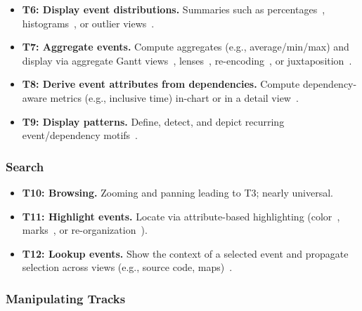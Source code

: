 \begin{refsection}
\begin{itemize}\itemsep0.25ex
\item \textbf{T6: Display event distributions.} Summaries such as percentages~\cite{adhianto2010hpctoolkit}, histograms~\cite{sakin2022traveler}, or outlier views~\cite{jo2014livegantt, schaubschlaeger2003event}. 

\item \textbf{T7: Aggregate events.} Compute aggregates (e.g., average/min/max) and display via aggregate Gantt views~\cite{sakin2022traveler, nesi2023summarizing, kaldor2017canopy}, lenses~\cite{jo2014livegantt}, re-encoding~\cite{topol1998pvanim}, or juxtaposition~\cite{gupta2016movementslicer}.

\item \textbf{T8: Derive event attributes from dependencies.} Compute dependency-aware metrics (e.g., inclusive time) in-chart or in a detail view~\cite{adhianto2010hpctoolkit, sakin2022traveler}.

\item \textbf{T9: Display patterns.} Define, detect, and depict recurring event/dependency motifs~\cite{de2010zinsight, isaacs2014combing}.
\end{itemize}

\subsubsection{Search}

\begin{itemize}\itemsep0.25ex
\item \textbf{T10: Browsing.} Zooming and panning leading to T3; nearly universal.

\item \textbf{T11: Highlight events.} Locate via attribute-based highlighting (color~\cite{adhianto2010hpctoolkit, isaacs2014combing, zaki1999toward, sakin2022traveler, nesi2023summarizing, kaldor2017canopy, dkabrowski2024manufacturing}, marks~\cite{sun2021daisen}, or re-organization~\cite{jo2014livegantt,luz2010improving}).

\item \textbf{T12: Lookup events.} Show the context of a selected event and propagate selection across views (e.g., source code, maps)~\cite{yan1995performance, adhianto2010hpctoolkit, zaki1999toward, gupta2016movementslicer}.
\end{itemize}

\subsubsection{Manipulating Tracks}


\end{refsection}
